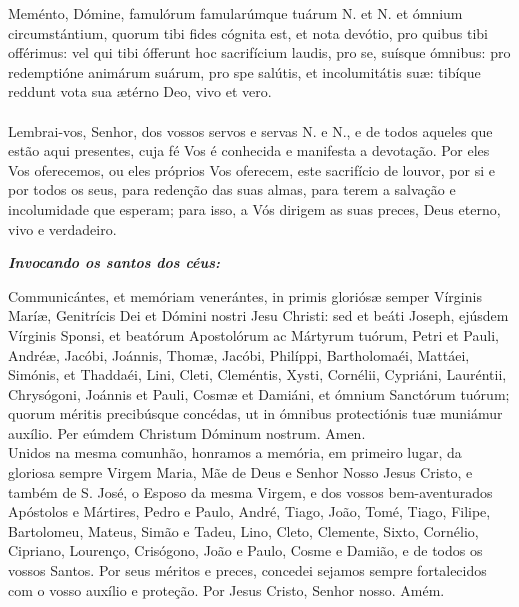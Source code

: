 \begin{multicols}{2}
	\noindent Meménto, Dómine, famulórum famularúmque tuárum N. et N. et ómnium circumstántium, quorum tibi fides cógnita est, et nota devótio, pro quibus tibi offérimus: vel qui tibi ófferunt hoc sacrifícium laudis, pro se, suísque ómnibus: pro redemptióne animárum suárum, pro spe salútis, et incolumitátis suæ: tibíque reddunt vota sua ætérno Deo, vivo et vero.
	\\
	\\Lembrai-vos, Senhor, dos vossos servos e servas N. e N., e de todos aqueles que estão aqui presentes, cuja fé Vos é conhecida e manifesta a devotação. Por eles Vos oferecemos, ou eles próprios Vos oferecem, este sacrifício de louvor, por si e por todos os seus, para redenção das suas almas, para terem a salvação e incolumidade que esperam; para isso, a Vós dirigem as suas preces, Deus eterno, vivo e verdadeiro.
\end{multicols}
\begin{flushleft}
	\textbf{\textit{Invocando os santos dos céus:}}
\end{flushleft}
\begin{multicols}{2}
	\noindent Communicántes, et memóriam venerántes, in primis gloriósæ semper Vírginis Maríæ, Genitrícis Dei et Dómini nostri Jesu Christi: sed et beáti Joseph, ejúsdem Vírginis Sponsi, et beatórum Apostolórum ac Mártyrum tuórum, Petri et Pauli, Andréæ, Jacóbi, Joánnis, Thomæ, Jacóbi, Philíppi, Bartholomaéi, Mattáei, Simónis, et Thaddaéi, Lini, Cleti, Cleméntis, Xysti, Cornélii, Cypriáni, Lauréntii, Chrysógoni, Joánnis et Pauli, Cosmæ et Damiáni, et ómnium Sanctórum tuórum; quorum méritis precibúsque concédas, ut in ómnibus protectiónis tuæ muniámur auxílio. Per eúmdem Christum Dóminum nostrum. Amen. 
	\\Unidos na mesma comunhão, honramos a memória, em primeiro lugar, da gloriosa sempre Virgem Maria, Mãe de Deus e Senhor Nosso Jesus Cristo, e também de S. José, o Esposo da mesma Virgem, e dos vossos bem-aventurados Apóstolos e Mártires, Pedro e Paulo, André, Tiago, João, Tomé, Tiago, Filipe, Bartolomeu, Mateus, Simão e Tadeu, Lino, Cleto, Clemente, Sixto, Cornélio, Cipriano, Lourenço, Crisógono, João e Paulo, Cosme e Damião, e de todos os vossos Santos. Por seus méritos e preces, concedei sejamos sempre fortalecidos com o vosso auxílio e proteção. Por Jesus Cristo, Senhor nosso. Amém. 
\end{multicols}
